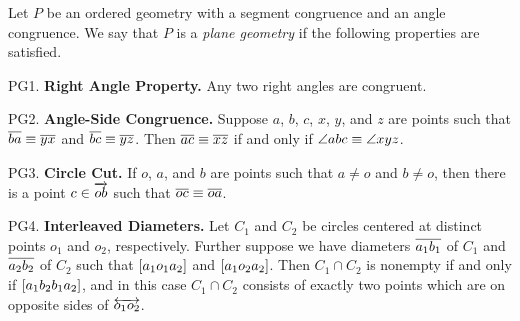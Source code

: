 \begin{dfn}
Let \(P\) be an ordered geometry with a segment congruence and an angle congruence.
We say that \(P\) is a \emph{plane geometry} if the following properties are satisfied.
\begin{proplist}
\item[PG1.] \textbf{Right Angle Property.} Any two right angles are congruent.

\item[PG2.] \textbf{Angle-Side Congruence.} Suppose \(a\), \(b\), \(c\), \(x\), \(y\), and \(z\) are points such that \(\overline{ba} \equiv \overline{yx}\) and \(\overline{bc} \equiv \overline{yz}\).
Then \(\overline{ac} \equiv \overline{xz}\) if and only if \(\angle{abc} \equiv \angle{xyz}\).

\item[PG3.] \textbf{Circle Cut.} If \(o\), \(a\), and \(b\) are points such that \(a \neq o\) and \(b \neq o\), then there is a point \(c \in \overrightarrow{ob}\) such that \(\overline{oc} \equiv \overline{oa}\).

\begin{center}
\end{center}

\item[PG4.] \textbf{Interleaved Diameters.} Let \(C_1\) and \(C_2\) be circles centered at distinct points \(o_1\) and \(o_2\), respectively.
Further suppose we have diameters \(\overline{a_1b_1}\) of \(C_1\) and \(\overline{a_2b_2}\) of \(C_2\) such that \([ a_1 o_1 a_2 ]\) and \([ a_1 o_2 a_2 ]\).
Then \(C_1 \cap C_2\) is nonempty if and only if \([ a_1b_2b_1a_2 ]\), and in this case \(C_1 \cap C_2\) consists of exactly two points which are on opposite sides of \(\overleftrightarrow{o_1o_2}\).


\end{proplist}
\end{dfn}
